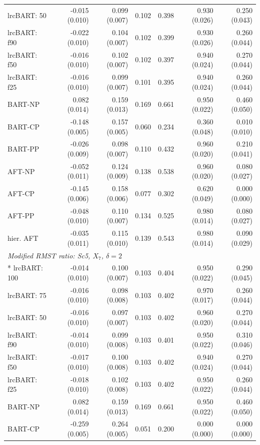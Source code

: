 \begin{landscape}
\begin{longtable}{lrrrrrr}
lrcBART: 50 & -0.015 (0.010) & 0.099 (0.007) & 0.102 & 0.398 & 0.930 (0.026) & 0.250 (0.043) \\
lrcBART: f90 & -0.022 (0.010) & 0.104 (0.007) & 0.102 & 0.399 & 0.930 (0.026) & 0.260 (0.044) \\
lrcBART: f50 & -0.016 (0.010) & 0.102 (0.007) & 0.102 & 0.397 & 0.940 (0.024) & 0.270 (0.044) \\
lrcBART: f25 & -0.016 (0.010) & 0.099 (0.007) & 0.101 & 0.395 & 0.940 (0.024) & 0.260 (0.044) \\
BART-NP & 0.082 (0.014) & 0.159 (0.013) & 0.169 & 0.661 & 0.950 (0.022) & 0.460 (0.050) \\
BART-CP & -0.148 (0.005) & 0.157 (0.005) & 0.060 & 0.234 & 0.360 (0.048) & 0.010 (0.010) \\
BART-PP & -0.026 (0.009) & 0.098 (0.007) & 0.110 & 0.432 & 0.960 (0.020) & 0.210 (0.041) \\
AFT-NP & -0.052 (0.011) & 0.124 (0.009) & 0.138 & 0.538 & 0.960 (0.020) & 0.080 (0.027) \\
AFT-CP & -0.145 (0.006) & 0.158 (0.006) & 0.077 & 0.302 & 0.620 (0.049) & 0.000 (0.000) \\
AFT-PP & -0.048 (0.010) & 0.110 (0.007) & 0.134 & 0.525 & 0.980 (0.014) & 0.080 (0.027) \\
hier. AFT & -0.035 (0.011) & 0.115 (0.010) & 0.139 & 0.543 & 0.980 (0.014) & 0.090 (0.029) \\
\multicolumn{7}{l}{\strut\textit{Modified RMST ratio: Sc5, $X_7$, $\delta=2$}}\\*
lrcBART: 100 & -0.014 (0.010) & 0.100 (0.007) & 0.103 & 0.404 & 0.950 (0.022) & 0.290 (0.045) \\
lrcBART: 75 & -0.016 (0.010) & 0.098 (0.008) & 0.103 & 0.402 & 0.970 (0.017) & 0.260 (0.044) \\
lrcBART: 50 & -0.016 (0.010) & 0.097 (0.007) & 0.103 & 0.402 & 0.960 (0.020) & 0.270 (0.044) \\
lrcBART: f90 & -0.014 (0.010) & 0.099 (0.008) & 0.103 & 0.401 & 0.950 (0.022) & 0.310 (0.046) \\
lrcBART: f50 & -0.017 (0.010) & 0.100 (0.008) & 0.103 & 0.402 & 0.940 (0.024) & 0.270 (0.044) \\
lrcBART: f25 & -0.018 (0.010) & 0.102 (0.008) & 0.103 & 0.402 & 0.950 (0.022) & 0.260 (0.044) \\
BART-NP & 0.082 (0.014) & 0.159 (0.013) & 0.169 & 0.661 & 0.950 (0.022) & 0.460 (0.050) \\
BART-CP & -0.259 (0.005) & 0.264 (0.005) & 0.051 & 0.200 & 0.000 (0.000) & 0.000 (0.000) \\

\end{longtable}
\end{landscape}

